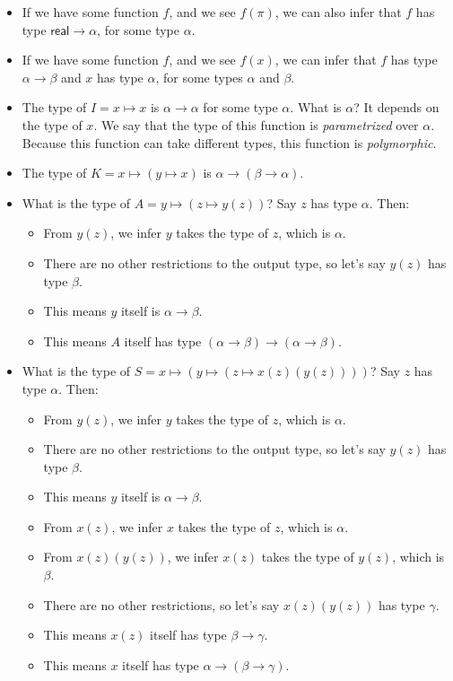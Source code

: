 \documentclass[11pt,paper=letter]{scrartcl}
\newcommand{\sf}{\mathsf}
\begin{document}
\begin{itemize}[leftmargin=*]
\item If we have some function $f$, and we see $f(\pi)$, we can also infer that $f$ has type $\sf{real} \to \alpha$, for some type $\alpha$.
\item If we have some function $f$, and we see $f(x)$, we can infer that $f$ has type $\alpha \to \beta$ and $x$ has type $\alpha$, for some types $\alpha$ and $\beta$.
\item The type of $I = x \mapsto x$ is $\alpha \to \alpha$ for some type $\alpha$. What is $\alpha$? It depends on the type of $x$. We say that the type of this function is \emph{parametrized} over $\alpha$. Because this function can take different types, this function is \emph{polymorphic}.
\item The type of $K = x \mapsto (y \mapsto x)$ is $\alpha \to (\beta \to \alpha)$.
\item What is the type of $A = y \mapsto (z \mapsto y(z))$? Say $z$ has type $\alpha$. Then:
\begin{itemize}
\item From $y(z)$, we infer $y$ takes the type of $z$, which is $\alpha$.
\item There are no other restrictions to the output type, so let's say $y(z)$ has type $\beta$.
\item This means $y$ itself is $\alpha \to \beta$.
\item This means $A$ itself has type $(\alpha \to \beta) \to (\alpha \to \beta)$.
\end{itemize}
\item What is the type of $S = x \mapsto \left(y \mapsto \left(z \mapsto x(z)(y(z))\right)\right)$? Say $z$ has type $\alpha$. Then:
\begin{itemize}
\item From $y(z)$, we infer $y$ takes the type of $z$, which is $\alpha$.
\item There are no other restrictions to the output type, so let's say $y(z)$ has type $\beta$.
\item This means $y$ itself is $\alpha \to \beta$.
\item From $x(z)$, we infer $x$ takes the type of $z$, which is $\alpha$.
\item From $x(z)(y(z))$, we infer $x(z)$ takes the type of $y(z)$, which is $\beta$.
\item There are no other restrictions, so let's say $x(z)(y(z))$ has type $\gamma$.
\item This means $x(z)$ itself has type $\beta \to \gamma$.
\item This means $x$ itself has type $\alpha \to (\beta \to \gamma)$.

\end{itemize}
\end{itemize}
\end{document}
